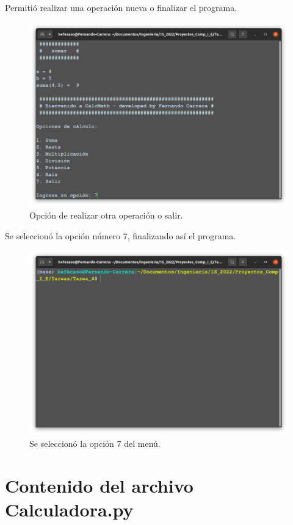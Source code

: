 \documentclass[12pt,letterpaper]{article}
\begin{document}
\begin{multicols}{2}
Permitió realizar una operación nueva o finalizar el programa.\\

\begin{figure}[H]
\centering
\includegraphics[width = \columnwidth]{Opcion_salir.png}
\caption{Opción de realizar otra operación o salir.}
\label{Opcion_salir}
\end{figure}

Se seleccionó la opción número 7, finalizando así el programa.

\begin{figure}[H]
\centering
\includegraphics[width = \columnwidth]{Saliendo.png}
\caption{Se seleccionó la opción 7 del menú.}
\label{Saliendo}
\end{figure}


\end{multicols}
\balance

\section{Contenido del archivo Calculadora.py}



\end{document}
